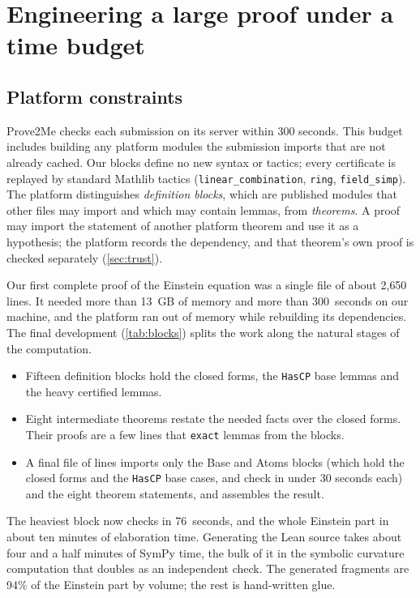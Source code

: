 \documentclass[11pt]{article}
\theoremstyle{definition}
\theoremstyle{remark}
\newcommand{\lean}[1]{\lstinline[basicstyle=\ttfamily\normalsize,columns=fullflexible,breaklines=false]{#1}}
\begin{document}
\section{Engineering a large proof under a time budget}\label{sec:engineering}

\subsection{Platform constraints}

Prove2Me checks each submission on its server within 300 seconds.
This budget includes building any platform modules the submission imports that are not already cached.
Our blocks define no new syntax or tactics; every certificate is replayed by standard Mathlib tactics (\lean{linear_combination}, \lean{ring}, \lean{field_simp}).
The platform distinguishes \emph{definition blocks}, which are published modules that other files may import and which may contain lemmas, from \emph{theorems}.
A proof may import the statement of another platform theorem and use it as a hypothesis; the platform records the dependency, and that theorem's own proof is checked separately (\cref{sec:trust}).

Our first complete proof of the Einstein equation was a single file of about 2{,}650 lines.
It needed more than 13~GB of memory and more than 300~seconds on our machine, and the platform ran out of memory while rebuilding its dependencies.
The final development (\cref{tab:blocks}) splits the work along the natural stages of the computation.
\begin{itemize}
  \item Fifteen definition blocks hold the closed forms, the \lean{HasCP} base lemmas and the heavy certified lemmas.
  \item Eight intermediate theorems restate the needed facts over the closed forms.
  Their proofs are a few lines that \lean{exact} lemmas from the blocks.
  \item A final file of \NumLinesFinal{} lines imports only the Base and Atoms blocks (which hold the closed forms and the \lean{HasCP} base cases, and check in under 30 seconds each) and the eight theorem statements, and assembles the result.
\end{itemize}
The heaviest block now checks in 76~seconds, and the whole Einstein part in about ten minutes of elaboration time. Generating the Lean source takes about four and a half minutes of SymPy time, the bulk of it in the symbolic curvature computation that doubles as an independent check. The generated fragments are 94\% of the Einstein part by volume; the rest is hand-written glue.
\end{document}
